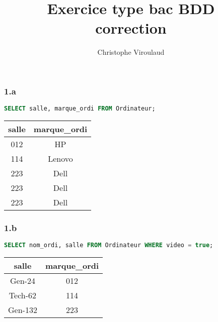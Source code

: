\documentclass[svgnames,11pt]{beamer}
\author[]{Christophe Viroulaud}
\title{Exercice type bac BDD\\correction}
\date{\framebox{\textbf{BDD 08}}}
\institute{Terminale - NSI}
\begin{document}
\begin{frame}
    \titlepage
\end{frame}
\begin{frame}[fragile]
    \frametitle{1.a}

    \begin{center}
        \begin{lstlisting}[language=SQL , basicstyle=\ttfamily\small, xleftmargin=2em, xrightmargin=2em]
SELECT salle, marque_ordi FROM Ordinateur;
\end{lstlisting}
    \end{center}
    \begin{center}
        \begin{tabular}{|c|c|}
            \hline
            salle & marque\_ordi \\
            \hline
            012   & HP           \\
            114   & Lenovo       \\
            223   & Dell         \\
            223   & Dell         \\
            223   & Dell         \\
            \hline
        \end{tabular}
    \end{center}

\end{frame}
\begin{frame}[fragile]
    \frametitle{1.b}

    \begin{center}
        \begin{lstlisting}[language=SQL , basicstyle=\ttfamily\small, xleftmargin=2em, xrightmargin=2em]
SELECT nom_ordi, salle FROM Ordinateur WHERE video = true;
\end{lstlisting}
    \end{center}
    \begin{center}
        \begin{tabular}{|c|c|}
            \hline
            salle & marque\_ordi \\
            \hline
            Gen-24&012          \\
            Tech-62&114       \\
            Gen-132&223        \\
            \hline
        \end{tabular}
    \end{center}

\end{frame}
\end{document}
